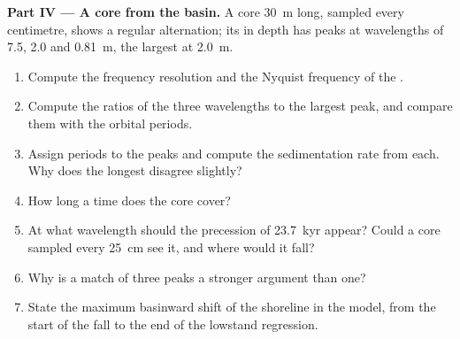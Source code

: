 \begin{problem}
\medskip\noindent\textbf{Part IV --- A core from the basin.} A core
\qty{30}{m} long, sampled every centimetre, shows a regular alternation; its
 in depth has peaks at wavelengths of 7.5, 2.0 and \qty{0.81}{m},
the largest at \qty{2.0}{m}.
\begin{enumerate}[resume]
\item Compute the frequency resolution and the Nyquist frequency of the
  .
\item Compute the ratios of the three wavelengths to the largest peak, and
  compare them with the orbital periods.
\item Assign periods to the peaks and compute the sedimentation rate from
  each. Why does the longest disagree slightly?
\item How long a time does the core cover?
\item At what wavelength should the precession of \qty{23.7}{kyr} appear?
  Could a core sampled every \qty{25}{cm} see it, and where would it fall?
\item Why is a match of three peaks a stronger argument than one?
\item State the maximum basinward shift of the shoreline in the model, from
  the start of the fall to the end of the lowstand regression.
\end{enumerate}
\end{problem}
